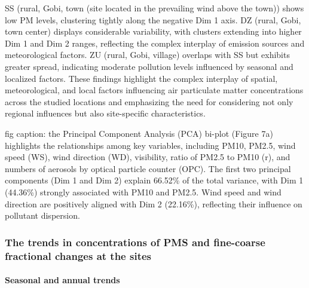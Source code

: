 \documentclass[
  11pt,
]{article}
\begin{document}
SS (rural, Gobi, town (site located in the prevailing wind above the
town)) shows low PM levels, clustering tightly along the negative Dim 1
axis. DZ (rural, Gobi, town center) displays considerable variability,
with clusters extending into higher Dim 1 and Dim 2 ranges, reflecting
the complex interplay of emission sources and meteorological factors. ZU
(rural, Gobi, village) overlaps with SS but exhibits greater spread,
indicating moderate pollution levels influenced by seasonal and
localized factors. These findings highlight the complex interplay of
spatial, meteorological, and local factors influencing air particulate
matter concentrations across the studied locations and emphasizing the
need for considering not only regional influences but also site-specific
characteristics.

fig caption: the Principal Component Analysis (PCA) bi-plot (Figure 7a)
highlights the relationships among key variables, including PM10, PM2.5,
wind speed (WS), wind direction (WD), visibility, ratio of PM2.5 to PM10
(r), and numbers of aerosols by optical particle counter (OPC). The
first two principal components (Dim 1 and Dim 2) explain 66.52\% of the
total variance, with Dim 1 (44.36\%) strongly associated with PM10 and
PM2.5. Wind speed and wind direction are positively aligned with Dim 2
(22.16\%), reflecting their influence on pollutant dispersion.

\subsubsection{The trends in concentrations of PMS and fine-coarse
fractional changes at the
sites}\label{the-trends-in-concentrations-of-pms-and-fine-coarse-fractional-changes-at-the-sites}

\paragraph{Seasonal and annual trends}\label{seasonal-and-annual-trends}
\end{document}
